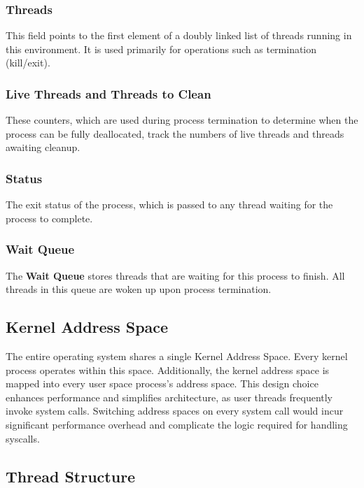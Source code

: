 \documentclass[a4paper,10pt,twoside]{report}
\theoremstyle{definition}
\begin{document}
\subsubsection{Threads}

This field points to the first element of a doubly linked list of threads running in this environment. It is used primarily for operations such as termination (kill/exit).

\subsubsection{Live Threads and Threads to Clean}

These counters, which are used during process termination to determine when the process can be fully deallocated, track the numbers of live threads and threads awaiting cleanup.

\subsubsection{Status}

The exit status of the process, which is passed to any thread waiting for the process to complete.

\subsubsection{Wait Queue}

The \textbf{Wait Queue} stores threads that are waiting for this process to finish. All threads in this queue are woken up upon process termination.

\subsection{Kernel Address Space}

The entire operating system shares a single Kernel Address Space. Every kernel process operates within this space. Additionally, the kernel address space is mapped into every user space process's address space. This design choice enhances performance and simplifies architecture, as user threads frequently invoke system calls. Switching address spaces on every system call would incur significant performance overhead and complicate the logic required for handling syscalls.

\clearpage

\subsection{Thread Structure}
\end{document}
